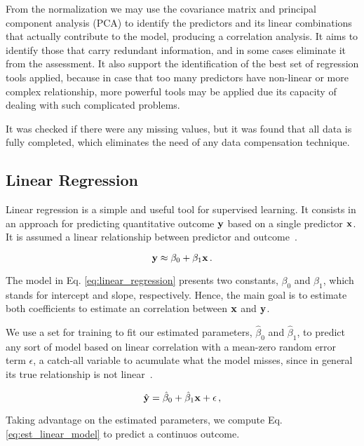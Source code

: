 From the normalization we may use the covariance matrix and principal component analysis (PCA) to identify the predictors and its linear combinations that actually contribute to the model, producing a correlation analysis. It aims to identify those that carry redundant information, and in some cases eliminate it from the assessment. It also support the identification of the best set of regression tools applied, because in case that too many predictors have non-linear or more complex relationship, more powerful tools may be applied due its capacity of dealing with such complicated problems. 

It was checked if there were any missing values, but it was found that all data is fully completed, which eliminates the need of any data compensation technique. 

\subsection{Linear Regression}
Linear regression is a simple and useful tool for supervised learning. It consists in an approach for predicting  quantitative outcome ${\bf y}$ based on a single predictor ${\bf x}$. It is assumed a linear relationship between predictor and outcome~\cite{James2013}.

\begin{equation}
{\bf y} \approx \beta_0 + \beta_1 {\bf x} \, . \label{eq:linear_regression}
\end{equation}

The model in Eq. \ref{eq:linear_regression} presents two constants, $\beta_0$ and $\beta_1$, which stands for intercept and slope, respectively. Hence, the main goal is to estimate both coefficients to estimate an correlation between ${\bf x}$ and ${\bf y}$.

We use a set for training to fit our estimated parameters, $\hat{\beta}_{0}$ and $\hat{\beta}_{1}$, to predict any sort of model based on linear correlation with a mean-zero random error term $\epsilon$, a catch-all variable to acumulate what the model misses, since in general its true relationship is not linear~\cite{James2013}.

\begin{equation}
\hat{{\bf y}} = \hat{\beta}_{0} + \hat{\beta}_{1} {\bf x} + {\bf \epsilon} \, ,
\label{eq:est_linear_model}
\end{equation}

Taking advantage on the estimated parameters, we compute Eq. \ref{eq:est_linear_model} to predict a continuos outcome. 

